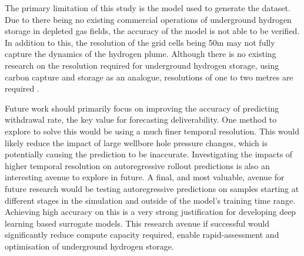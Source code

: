 The primary limitation of this study is the model used to generate the dataset. Due to there being no existing commercial operations of underground hydrogen storage in depleted gas fields, the accuracy of the model is not able to be verified. In addition to this, the resolution of the grid cells being 50m may not fully capture the dynamics of the hydrogen plume. Although there is no existing research on the resolution required for underground hydrogen storage, using carbon capture and storage as an analogue, resolutions of one to two metres are required \citep{gegewen_nested}. 

Future work should primarily focus on improving the accuracy of predicting withdrawal rate, the key value for forecasting deliverability. One method to explore to solve this would be using a much finer temporal resolution. This would likely reduce the impact of large wellbore hole pressure changes, which is potentially causing the prediction to be inaccurate. Investigating the impacts of higher temporal resolution on autoregressive rollout predictions is also an interesting avenue to explore in future. A final, and most valuable, avenue for future research would be testing autoregressive predictions on samples starting at different stages in the simulation and outside of the model's training time range. Achieving high accuracy on this is a very strong justification for developing deep learning based surrogate models. This research avenue if successful would significantly reduce compute capacity required, enable rapid-assessment and optimisation of underground hydrogen storage. 

